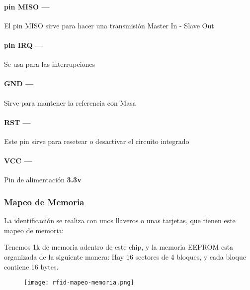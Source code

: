 \documentclass[../informe_krapp.tex]{subfiles}
\begin{document}
\paragraph{pin MISO ---}
El pin MISO sirve para hacer una transmisión Master In - Slave Out

\paragraph{pin IRQ ---}
Se usa para las interrupciones

\paragraph{GND ---}
Sirve para mantener la referencia con Masa

\paragraph{RST ---}
Este pin sirve para resetear o desactivar el circuito integrado

\paragraph{VCC ---}
Pin de alimentación \textbf{3.3v}

\clearpage
\subsubsection{Mapeo de Memoria}
La identificación se realiza con unos llaveros o unas tarjetas,
que tienen este mapeo de memoria:

Tenemos 1k de memoria adentro de este chip, y la memoria EEPROM esta organizada de la
siguiente manera: Hay 16 sectores de 4 bloques, y cada bloque contiene 16 bytes.

\begin{figure}[H]
	\centering
	\texttt{[image: rfid-mapeo-memoria.png]}
\end{figure}
\end{document}
